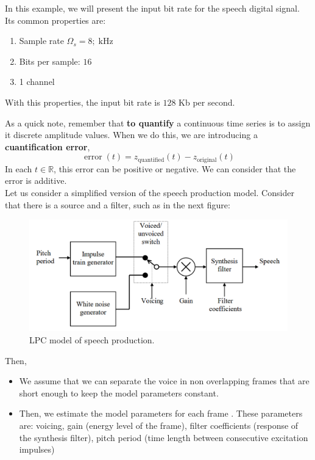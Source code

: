 \begin{example}
  In this example, we will present the input bit rate for the speech digital signal. Its common properties are:
    \begin{enumerate}
    \item Sample rate \(\Omega_{s} = 8 ; \operatorname{kHz}\)
    \item Bits per sample: \(16\)
          \item 1 channel
    \end{enumerate}

  With this properties, the input bit rate is \(128\) Kb per second.

\end{example}

As a quick note, remember that \textbf{to quantify} a continuous time series is to assign it discrete amplitude values. When we do this, we are introducing a \textbf{cuantification error},
\[
\operatorname{error}(t) = z_{\operatorname{quantified}}(t) - z_{\operatorname{original}}(t)  
\]
In each \(t \in \mathbb R\), this error can be positive or negative. We can consider that the error is additive.\\

Let us consider a simplified version of the speech production model. Consider that there is a source and a filter, such as in the next figure:

\begin{figure}[!h]
\centering
\includegraphics[scale=0.6]{Figures/SpeechGeneration}
\caption{LPC model of speech production.}
\end{figure}

Then,

\begin{itemize}
  \item We assume that we can separate the voice in non overlapping frames that are short enough to keep the model parameters constant.
  \item Then, we estimate the model parameters for each frame . These parameters are: voicing, gain (energy level of the frame), filter coefficients (response of the synthesis filter), pitch period (time length between consecutive excitation impulses)
\end{itemize}

